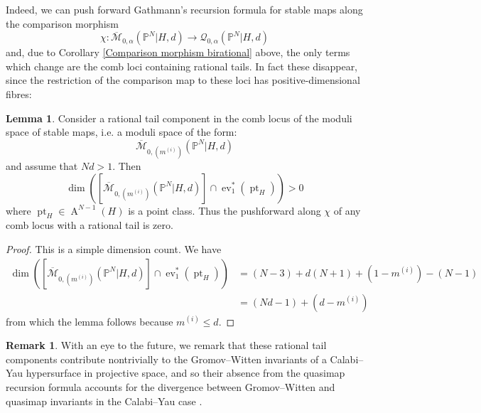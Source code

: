 \documentclass[10pt]{amsart}
\newcommand{\M}[4]{\overline{\mathcal{M}}_{#1,#2}(#3,#4)}
\newcommand{\Q}[4]{\mathcal{Q}_{#1,#2}(#3,#4)}
\newcommand{\PP}{\mathbb P}
\renewcommand{\to}{\rightarrow}
\newcommand{\comp}{\chi}
\newcommand{\Achow}{\operatorname{A}}
\newcommand{\pt}{\operatorname{pt}}
\newcommand{\ev}{\operatorname{ev}}
\theoremstyle{definition}
\newtheorem{lem}[thm]{Lemma}
\theoremstyle{definition}
\newtheorem{remark}[thm]{Remark}
\begin{document}
Indeed, we can push forward Gathmann's recursion formula for stable maps along the comparison morphism
\begin{equation*} \comp \colon \M{0}{\alpha}{\PP^N|H}{d}\to\Q{0}{\alpha}{\PP^N|H}{d} \end{equation*}
and, due to Corollary \ref{Comparison morphism birational} above, the only terms which change are the comb loci containing rational tails. In fact these disappear, since the restriction of the comparison map to these loci has positive-dimensional fibres:
\begin{lem}\label{lem:posdimfiber} Consider a rational tail component in the comb locus of the moduli space of stable maps, i.e. a moduli space of the form:
\begin{equation*} \M{0}{(m^{(i)})}{\PP^N|H}{d} \end{equation*}
and assume that $Nd>1$.  Then
\begin{equation*} \dim \left( [\M{0}{(m^{(i)})}{\PP^N|H}{d}] \cap \ev_1^*(\pt_H) \right) > 0 \end{equation*}
where $\pt_H \in \Achow^{N-1}(H)$ is a point class. Thus the pushforward along $\comp$ of any comb locus with a rational tail is zero.
\end{lem}
\begin{proof} This is a simple dimension count. We have
\begin{align*} \dim \left( [\M{0}{(m^{(i)})}{\PP^N|H}{d}] \cap \ev_1^*(\pt_H) \right) & =(N-3)+d(N+1)+(1-m^{(i)})-(N-1) \\
& =(Nd-1)+(d-m^{(i)})
\end{align*}
from which the lemma follows because $m^{(i)} \leq d$.
\end{proof}
\begin{remark} With an eye to the future, we remark that these rational tail components contribute nontrivially to the Gromov--Witten invariants of a Calabi--Yau hypersurface in projective space, and so their absence from the quasimap recursion formula accounts for the divergence between Gromov--Witten and quasimap invariants in the Calabi--Yau case \cite[Rmk. 1.6]{Ga-MF}. \end{remark}
\end{document}
